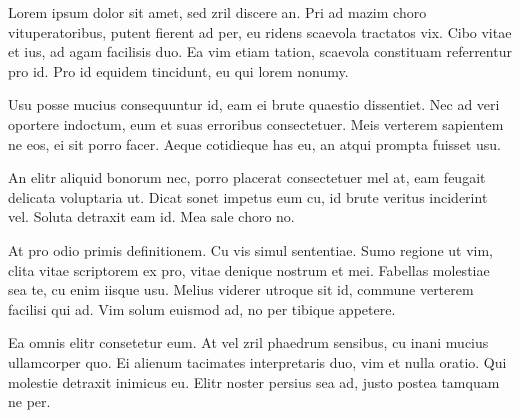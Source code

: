 Lorem ipsum dolor sit amet, sed zril discere an. Pri ad mazim choro vituperatoribus, putent fierent ad per, eu ridens scaevola tractatos vix. Cibo vitae et ius, ad agam facilisis duo. Ea vim etiam tation, scaevola constituam referrentur pro id. Pro id equidem tincidunt, eu qui lorem nonumy.

Usu posse mucius consequuntur id, eam ei brute quaestio dissentiet. Nec ad veri oportere indoctum, eum et suas erroribus consectetuer. Meis verterem sapientem ne eos, ei sit porro facer. Aeque cotidieque has eu, an atqui prompta fuisset usu.

An elitr aliquid bonorum nec, porro placerat consectetuer mel at, eam feugait delicata voluptaria ut. Dicat sonet impetus eum cu, id brute veritus inciderint vel. Soluta detraxit eam id. Mea sale choro no.

At pro odio primis definitionem. Cu vis simul sententiae. Sumo regione ut vim, clita vitae scriptorem ex pro, vitae denique nostrum et mei. Fabellas molestiae sea te, cu enim iisque usu. Melius viderer utroque sit id, commune verterem facilisi qui ad. Vim solum euismod ad, no per tibique appetere.

Ea omnis elitr consetetur eum. At vel zril phaedrum sensibus, cu inani mucius ullamcorper quo. Ei alienum tacimates interpretaris duo, vim et nulla oratio. Qui molestie detraxit inimicus eu. Elitr noster persius sea ad, justo postea tamquam ne per.